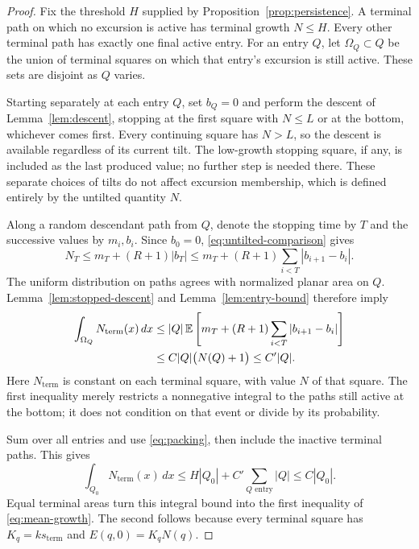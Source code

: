 \begin{proof}
Fix the threshold $H$ supplied by
Proposition~\ref{prop:persistence}. A terminal path on which no
excursion is active has terminal growth $N\le H$. Every other terminal
path has exactly one final active entry. For an entry $Q$, let
$\Omega_Q\subset Q$ be the union of terminal squares on which that
entry's excursion is still active. These sets are disjoint as $Q$
varies.

Starting separately at each entry $Q$, set $b_Q=0$ and perform the
descent of Lemma~\ref{lem:descent}, stopping at the first square with
$N\le L$ or at the bottom, whichever comes first. Every continuing
square has $N>L$, so the descent is available regardless of its current
tilt. The low-growth stopping square, if any, is included as the last
produced value; no further step is needed there. These separate choices
of tilts do not affect excursion membership, which is defined entirely
by the untilted quantity $N$.

Along a random descendant path from $Q$, denote the stopping time by
$T$ and the successive values by $m_i,b_i$. Since $b_0=0$,
\eqref{eq:untilted-comparison} gives
\[
 N_T\le m_T+(R+1)|b_T|
 \le m_T+(R+1)\sum_{i<T}|b_{i+1}-b_i|.
\]
The uniform distribution on paths agrees with normalized planar area
on $Q$. Lemma~\ref{lem:stopped-descent} and
Lemma~\ref{lem:entry-bound} therefore imply
\[
 \begin{split}
 \int_{\Omega_Q}N_{\mathrm{term}}(x)\,dx
 &\le |Q|\,\mathbb E\left[m_T+(R+1)
                    \sum_{i<T}|b_{i+1}-b_i|\right]\\
 &\le C|Q|\bigl(N(Q)+1\bigr)
 \le C'|Q|.
 \end{split}
\]
Here $N_{\mathrm{term}}$ is constant on each terminal square, with
value $N$ of that square. The first inequality merely restricts a
nonnegative integral to the paths still active at the bottom; it does
not condition on that event or divide by its probability.

Sum over all entries and use \eqref{eq:packing}, then include the
inactive terminal paths. This gives
\[
 \int_{Q_0}N_{\mathrm{term}}(x)\,dx
 \le H|Q_0|+C'\sum_{Q\text{ entry}}|Q|
 \le C|Q_0|.
\]
Equal terminal areas turn this integral bound into the first inequality
of \eqref{eq:mean-growth}. The second follows because every terminal
square has $K_q=ks_{\mathrm{term}}$ and $E(q,0)=K_qN(q)$.
\end{proof}
